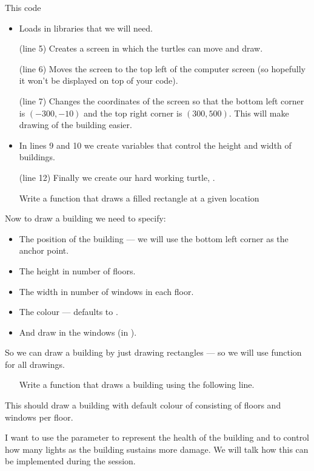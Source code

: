 \documentclass{coderdojo}
\newcommand\TODO[1]{
\begin{itemize}
\item[\todoSymbol] \color{todo} #1
\end{itemize}}
\begin{document}
This code
\begin{itemize}
\item Loads in libraries that we will need.
\item[(line 5)] Creates a screen in which the turtles can move and draw.
\item[(line 6)] Moves the screen to the top left of the computer screen (so hopefully it won't be displayed on top of your code).
\item[(line 7)] Changes the coordinates of the screen so that the bottom left corner is $(-300,-10)$ and the top right corner is $(300,500)$. This will make drawing of the building easier.
\item 
In lines 9 and 10 we create variables that control the height and width of buildings.
\item[(line 12)] 
Finally we create our hard working turtle, .

\end{itemize}


\TODO{Write a function that draws a filled rectangle at a given location}
 

Now to draw a building we need to specify:
\begin{itemize}
\item The position of the building --- we will use the bottom left corner as the anchor point.
\item The height in number of floors.
\item The width in number of windows in each floor.
\item The colour --- defaults to .
\item And draw in the windows (in ).
\end{itemize}
So we can draw a building by just drawing rectangles ---  so we will use function  for all drawings. 

\clearpage
\TODO{Write a function that draws a building using the following line.}


This should draw a building with default colour of  consisting of  floors and  windows per floor.

\begin{center}
\begin{tcolorbox}[width=.9\textwidth,title=What does the parameter \code{health} do?]
I want to use the parameter  to represent the health of the building and to control how many lights as the building sustains more damage.  We will talk how this can be implemented during the session.
\end{tcolorbox}
\end{center}
\end{document}
